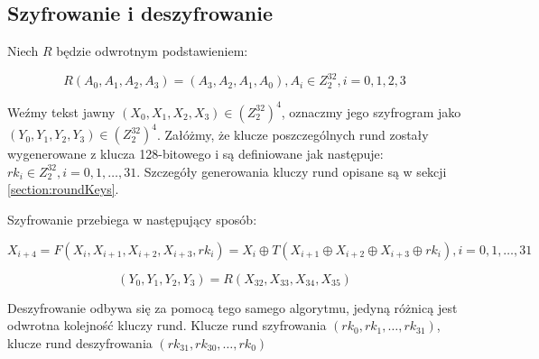 \subsection{Szyfrowanie i deszyfrowanie}

Niech $R$ będzie odwrotnym podstawieniem:

\begin{equation*}
    R(A_0, A_1, A_2, A_3) = (A_3, A_2, A_1, A_0), A_i \in Z^{32}_2, i = 0, 1, 2, 3
\end{equation*}

Weźmy tekst jawny $(X_0, X_1, X_2, X_3) \in (Z^{32}_2)^4$, oznaczmy jego szyfrogram jako $(Y_0, Y_1, Y_2, Y_3) \in (Z^{32}_2)^4$. Załóżmy, że klucze poszczególnych rund zostały wygenerowane z klucza 128-bitowego i są definiowane jak następuje: $rk_i \in Z^{32}_2, i = 0,1, \ldots, 31$. Szczegóły generowania kluczy rund opisane są w sekcji \ref{section:roundKeys}.

Szyfrowanie przebiega w następujący sposób:

\begin{equation*}
    X_{i+4} = F(X_i, X_{i+1}, X_{i+2}, X_{i+3}, rk_i) = X_i \oplus T(X_{i+1} \oplus X_{i+2} \oplus X_{i+3} \oplus rk_i), i = 0,1,\ldots,31
\end{equation*}
        
\begin{equation*}
    (Y_0, Y_1, Y_2, Y_3) = R(X_{32}, X_{33}, X_{34}, X_{35})
\end{equation*}

Deszyfrowanie odbywa się za pomocą tego samego algorytmu, jedyną różnicą jest odwrotna kolejność kluczy rund. Klucze rund szyfrowania $(rk_0, rk_1, \ldots, rk_{31})$, klucze rund deszyfrowania $(rk_{31}, rk_{30}, \ldots, rk_0)$

